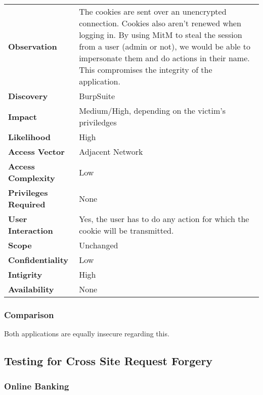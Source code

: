 \begin{tabular}{l|p{10cm}}
\textbf{Observation} & The cookies are sent over an unencrypted connection. Cookies also aren't renewed when logging in. By using MitM to steal the session from a user (admin or not), we would be able to impersonate them and do actions in their name. This compromises the integrity of the application. \\
\textbf{Discovery} & BurpSuite \\
\textbf{Impact} & Medium/High, depending on the victim's priviledges \\
\textbf{Likelihood} & High \\
\textbf{Access Vector} & Adjacent Network \\
\textbf{Access Complexity} & Low\\
\textbf{Privileges Required} & None \\
\textbf{User Interaction} & Yes, the user has to do any action for which the cookie will be transmitted. \\
\textbf{Scope} & Unchanged \\
\textbf{Confidentiality} & Low \\
\textbf{Intigrity} & High\\
\textbf{Availability} & None \\
\end{tabular}

\subsubsection*{Comparison}
Both applications are equally insecure regarding this.

\clearpage


\subsection{Testing for Cross Site Request Forgery}

\subsubsection*{Online Banking}

